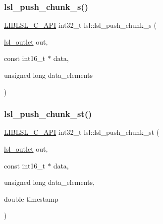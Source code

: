 \subsubsection{\texorpdfstring{lsl\+\_\+push\+\_\+chunk\+\_\+s()}{lsl\_push\_chunk\_s()}}
{\footnotesize\ttfamily \hyperlink{lsl__cpp_8h_aafd0ef1813e8be84a1420c4f1df64615}{L\+I\+B\+L\+S\+L\+\_\+\+C\+\_\+\+A\+PI} int32\+\_\+t lsl\+::lsl\+\_\+push\+\_\+chunk\+\_\+s (\begin{DoxyParamCaption}\item[{\hyperlink{namespacelsl_abcf512b0f66dacf86c10b165995fd50b}{lsl\+\_\+outlet}}]{out,  }\item[{const int16\+\_\+t $\ast$}]{data,  }\item[{unsigned long}]{data\+\_\+elements }\end{DoxyParamCaption})}

\mbox{\label{namespacelsl_a6d02c87538ca2e49831fefc79a4ef751}} 
\subsubsection{\texorpdfstring{lsl\+\_\+push\+\_\+chunk\+\_\+st()}{lsl\_push\_chunk\_st()}}
{\footnotesize\ttfamily \hyperlink{lsl__cpp_8h_aafd0ef1813e8be84a1420c4f1df64615}{L\+I\+B\+L\+S\+L\+\_\+\+C\+\_\+\+A\+PI} int32\+\_\+t lsl\+::lsl\+\_\+push\+\_\+chunk\+\_\+st (\begin{DoxyParamCaption}\item[{\hyperlink{namespacelsl_abcf512b0f66dacf86c10b165995fd50b}{lsl\+\_\+outlet}}]{out,  }\item[{const int16\+\_\+t $\ast$}]{data,  }\item[{unsigned long}]{data\+\_\+elements,  }\item[{double}]{timestamp }\end{DoxyParamCaption})}

\mbox{\label{namespacelsl_a66784045ca9dec23b491f56474009de4}} 
